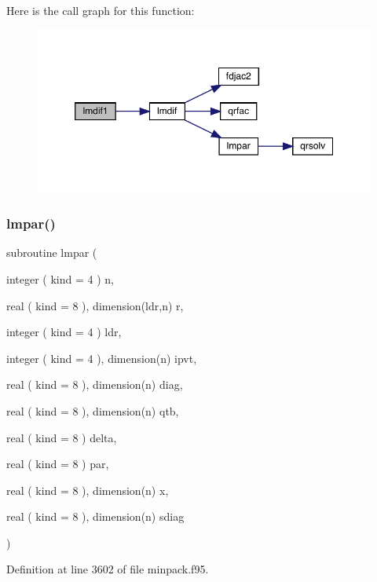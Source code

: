Here is the call graph for this function\+:\nopagebreak
\begin{figure}[H]
\begin{center}
\leavevmode
\includegraphics[width=350pt]{minpack_8f95_a700bf6f1bdcace537df37252fd26c723_cgraph}
\end{center}
\end{figure}
\mbox{\label{minpack_8f95_a1dc1e9adda30350383f28f6cc6361365}} 
\subsubsection{\texorpdfstring{lmpar()}{lmpar()}}
{\footnotesize\ttfamily subroutine lmpar (\begin{DoxyParamCaption}\item[{integer ( kind = 4 )}]{n,  }\item[{real ( kind = 8 ), dimension(ldr,n)}]{r,  }\item[{integer ( kind = 4 )}]{ldr,  }\item[{integer ( kind = 4 ), dimension(n)}]{ipvt,  }\item[{real ( kind = 8 ), dimension(n)}]{diag,  }\item[{real ( kind = 8 ), dimension(n)}]{qtb,  }\item[{real ( kind = 8 )}]{delta,  }\item[{real ( kind = 8 )}]{par,  }\item[{real ( kind = 8 ), dimension(n)}]{x,  }\item[{real ( kind = 8 ), dimension(n)}]{sdiag }\end{DoxyParamCaption})}



Definition at line 3602 of file minpack.\+f95.

